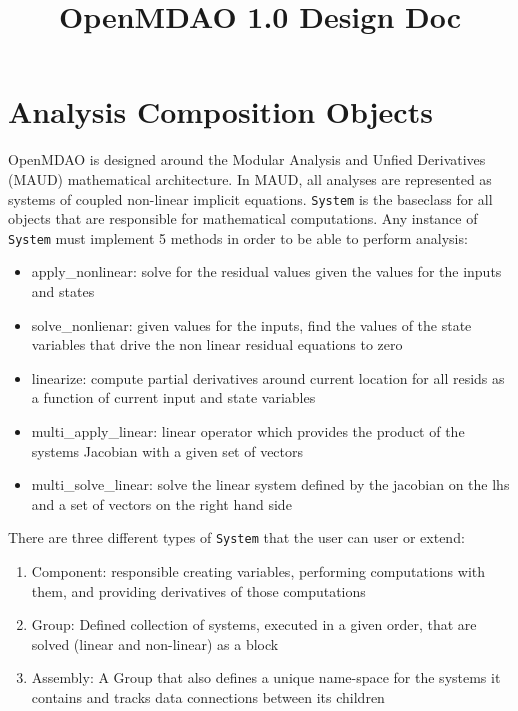 \documentclass[12pt]{article}
\title {OpenMDAO 1.0 Design Doc}
\newcommand{\classname}[1]{\texttt{#1}}
\begin{document}
\maketitle

\section{Analysis Composition Objects}

OpenMDAO is designed around the Modular Analysis and Unfied Derivatives (MAUD) mathematical
architecture. In MAUD, all analyses are represented as systems of coupled non-linear implicit equations.
\classname{System} is the baseclass for all objects that are responsible for mathematical computations.
Any instance of \classname{System} must implement 5 methods in order to be able to perform
analysis:

\begin{itemize}
    \item apply\_nonlinear: solve for the residual values given the values for
    the inputs and states
    \item solve\_nonlienar: given values for the inputs, find the values of the
    state variables that drive the non linear residual equations to zero
    \item linearize: compute partial derivatives around current location for all
    resids as a function of current input and state variables
    \item multi\_apply\_linear: linear operator which provides the product of the systems
    Jacobian with a given set of vectors
    \item multi\_solve\_linear: solve the linear system defined by the jacobian on the
    lhs and a set of vectors on the right hand side
\end{itemize}

There are three different types of \classname{System} that the user can user or extend:
\begin{enumerate}
    \item Component: responsible creating variables, performing computations with them, and providing derivatives of those computations
    \item Group: Defined collection of systems, executed in a given order, that are solved (linear and non-linear) as a block
    \item Assembly: A Group that also defines a unique name-space for the systems it contains and tracks data connections between its children
\end{enumerate}
\end{document}
